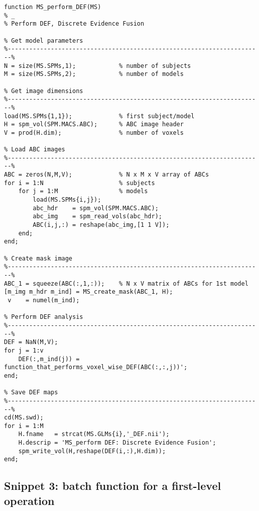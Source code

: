 \documentclass[a4paper,12pt]{article}
\begin{document}
\vspace{1em}
\begin{verbatim}
function MS_perform_DEF(MS)
% _
% Perform DEF, Discrete Evidence Fusion

% Get model parameters
%-----------------------------------------------------------------------%
N = size(MS.SPMs,1);            % number of subjects
M = size(MS.SPMs,2);            % number of models

% Get image dimensions
%-----------------------------------------------------------------------%
load(MS.SPMs{1,1});             % first subject/model
H = spm_vol(SPM.MACS.ABC);      % ABC image header
V = prod(H.dim);                % number of voxels

% Load ABC images
%-----------------------------------------------------------------------%
ABC = zeros(N,M,V);             % N x M x V array of ABCs
for i = 1:N                     % subjects
    for j = 1:M                 % models
        load(MS.SPMs{i,j});
        abc_hdr    = spm_vol(SPM.MACS.ABC);
        abc_img    = spm_read_vols(abc_hdr);
        ABC(i,j,:) = reshape(abc_img,[1 1 V]);
    end;
end;

% Create mask image
%-----------------------------------------------------------------------%
ABC_1 = squeeze(ABC(:,1,:));    % N x V matrix of ABCs for 1st model
[m_img m_hdr m_ind] = MS_create_mask(ABC_1, H);
 v    = numel(m_ind);

% Perform DEF analysis
%-----------------------------------------------------------------------%
DEF = NaN(M,V);
for j = 1:v
    DEF(:,m_ind(j)) = function_that_performs_voxel_wise_DEF(ABC(:,:,j))';
end;

% Save DEF maps
%-----------------------------------------------------------------------%
cd(MS.swd);
for i = 1:M
    H.fname   = strcat(MS.GLMs{i},'_DEF.nii');
    H.descrip = 'MS_perform DEF: Discrete Evidence Fusion';
    spm_write_vol(H,reshape(DEF(i,:),H.dim));
end;
\end{verbatim}


\pagebreak
\subsection*{Snippet 3: batch function for a first-level operation} \label{sec:ABC-batch}
\end{document}
